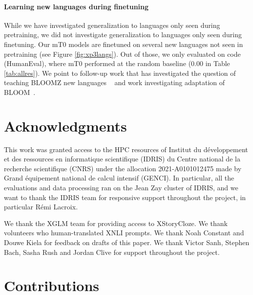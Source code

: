 \documentclass[11pt]{article}
\begin{document}
\paragraph{Learning new languages during finetuning} While we have investigated generalization to languages only seen during pretraining, we did not investigate generalization to languages only seen during finetuning. Our mT0 models are finetuned on several new languages not seen in pretraining (see Figure \ref{fig:xp3langs}). Out of those, we only evaluated on code (HumanEval), where mT0 performed at the random baseline (0.00 in Table \ref{tab:allres}). We point to follow-up work that has investigated the question of teaching BLOOMZ new languages ~\cite{yong2022bloom+,cahyawijaya2023instruct} and work investigating adaptation of BLOOM~\cite{ennen2023extending,yong2022adapting}.

\newpage

\section*{Acknowledgments}

This work was granted access to the HPC resources of Institut du d\'eveloppement et des ressources en informatique scientifique (IDRIS) du Centre national de la recherche scientifique (CNRS) under the allocation 2021-A0101012475 made by Grand \'equipement national de calcul intensif (GENCI). In particular, all the evaluations and data processing ran on the Jean Zay cluster of IDRIS, and we want to thank the IDRIS team for responsive support throughout the project, in particular R\'emi Lacroix.

We thank the XGLM team for providing access to XStoryCloze. We thank volunteers who human-translated XNLI prompts. We thank Noah Constant and Douwe Kiela for feedback on drafts of this paper. We thank Victor Sanh, Stephen Bach, Sasha Rush and Jordan Clive for support throughout the project.






\appendix

\onecolumn

\tableofcontents

\clearpage

\section{Contributions}
\label{sec:contributions}
\end{document}

